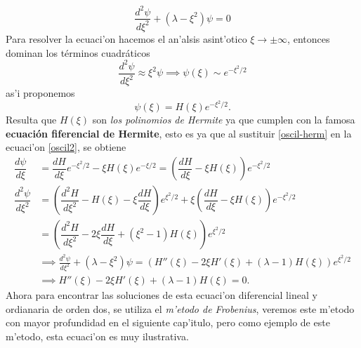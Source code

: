 \documentclass[main.tex]{subfiles}
\begin{document}
\begin{equation}\label{oscil2}
\frac{d^2\psi}{d\xi^2} + (\lambda - \xi^2)\psi = 0
\end{equation}
Para resolver la ecuaci'on hacemos el an'alsis asint'otico $\xi \to \pm\infty$, entonces dominan los términos cuadráticos
\begin{equation}
\frac{d^2\psi}{d\xi^2} \approx \xi^2\psi \implies \psi(\xi) \sim e^{-\xi^2/2}
\end{equation}
as'i proponemos
\begin{equation}\label{oscil-herm}
\psi(\xi) = H(\xi)e^{-\xi^2/2}.
\end{equation}
Resulta que $H(\xi)$ son \emph{los polinomios de Hermite} ya que cumplen con la famosa \textbf{ecuación fiferencial de Hermite}, esto es ya que al sustituir \ref{oscil-herm} en la ecuaci'on \ref{oscil2}, se obtiene
\begin{align*}
  \dfrac{d\psi}{d\xi}&=\dfrac{dH}{d\xi}e^{-\xi^{2}/2}-\xi H(\xi)e^{-\xi/2}
                       =\left(\dfrac{dH}{d\xi}-\xi H(\xi)\right)e^{-\xi^{2}/2}\\
  \dfrac{d^{2}\psi}{d\xi^{2}}&=\left(\dfrac{d^{2}H}{d\xi^{2}}-H(\xi)-\xi\dfrac{dH}{d\xi}\right)e^{\xi^{2}/2}+
                               \xi\left(\dfrac{dH}{d\xi}-\xi H(\xi)\right)e^{-\xi^{2}/2}\\
                     &=\left(\dfrac{d^{2}H}{d\xi^{2}}-2\xi\dfrac{dH}{d\xi}+(\xi^{2}-1)H(\xi)\right)e^{\xi^{2}/2}\\
  &\implies\frac{d^2\psi}{d\xi^2}+(\lambda-\xi^2)\psi=\left(H''(\xi)-2\xi H'(\xi)+(\lambda-1)H(\xi)\right)e^{\xi^{2}/2}\\
  &\implies H''(\xi) - 2\xi H'(\xi) + (\lambda - 1)H(\xi) = 0.
\end{align*}
Ahora para encontrar las soluciones de esta ecuaci'on diferencial lineal y ordianaria de orden dos, se utiliza el \emph{m'etodo de Frobenius}, veremos este m'etodo con mayor profundidad en el siguiente cap'itulo, pero como ejemplo de este m'etodo, esta ecuaci'on es muy ilustrativa.
\end{document}

